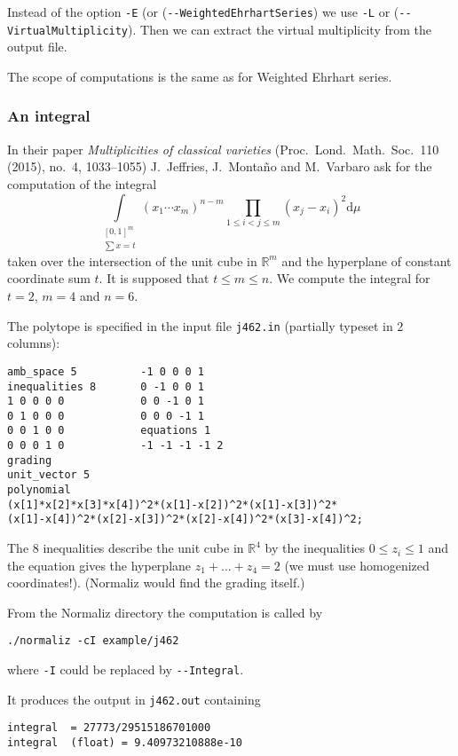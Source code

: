 \documentclass[12pt,a4paper]{scrartcl}
\theoremstyle{definition}
\def\RR{{\mathbb R}}
\def\ttt{\texttt}
\begin{document}
Instead of the option \verb|-E| (or (\verb|--WeightedEhrhartSeries|) we use \verb|-L| or (\verb|--VirtualMultiplicity|). Then we can extract the virtual multiplicity from the output file.

The scope of computations is the same as for Weighted Ehrhart series.

\subsubsection{An integral}
In their paper \emph{Multiplicities of classical varieties} (Proc.\ Lond.\ Math.\ Soc.\ 110 (2015), no.~4, 1033--1055) J.~Jeffries, J.~Monta\~no and M.~Varbaro ask
for the computation of the integral
$$
\int\limits_{\substack{[0,1]^m \\ \sum{x}= t}}(x_1\cdots x_{m})^{n-m}\prod_{1\le i<j \le m}(x_j-x_i)^2 \mathrm d{\mu}\
$$
taken over the intersection of the unit cube in $\RR^m$ and the hyperplane of constant coordinate sum $t$. It is supposed that $t\le m \le n$. We compute the integral for $t=2$, $m=4$ and $n=6$.

The polytope is specified in the input file \ttt{j462.in} (partially typeset in $2$
columns):

\begin{Verbatim}
amb_space 5          -1 0 0 0 1   
inequalities 8       0 -1 0 0 1   
1 0 0 0 0            0 0 -1 0 1   
0 1 0 0 0            0 0 0 -1 1   
0 0 1 0 0            equations 1  
0 0 0 1 0            -1 -1 -1 -1 2
grading
unit_vector 5
polynomial
(x[1]*x[2]*x[3]*x[4])^2*(x[1]-x[2])^2*(x[1]-x[3])^2*
(x[1]-x[4])^2*(x[2]-x[3])^2*(x[2]-x[4])^2*(x[3]-x[4])^2;
\end{Verbatim}

The $8$ inequalities describe the unit cube in $\RR^4$ by the inequalities $0\le z_i\le 1$
and the equation gives the hyperplane $z_1+\dots+z_4=2$ (we must use homogenized coordinates!). (Normaliz would find the grading itself.)

From the Normaliz directory the computation is called by

\begin{Verbatim}
./normaliz -cI example/j462
\end{Verbatim}
where \verb|-I| could be replaced by \verb|--Integral|.

It produces the output in \ttt{j462.out} containing

\begin{Verbatim}
integral  = 27773/29515186701000
integral  (float) = 9.40973210888e-10
\end{Verbatim}
\end{document}
